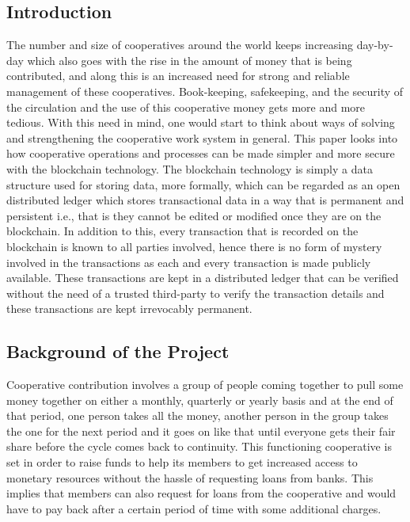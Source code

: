 \documentclass{article}
\begin{document}
\begin{flushleft}
\section{Introduction}
The number and size of cooperatives around the world keeps increasing day-by-day which also goes with the rise in the amount of money that is being contributed, and along this is an increased need for strong and reliable management of these cooperatives. Book-keeping, safekeeping, and the security of the circulation and the use of this cooperative money gets more and more tedious. With this need in mind, one would start to think about ways of solving and strengthening the cooperative work system in general. This paper looks into how cooperative operations and processes can be made simpler and more secure with the blockchain technology. The blockchain technology is simply a data structure used for storing data, more formally, which can be regarded as an open distributed ledger which stores transactional data in a way that is permanent and persistent i.e., that is they cannot be edited or modified once they are on the blockchain. In addition to this, every transaction that is recorded on the blockchain is known to all parties involved, hence there is no form of mystery involved in the transactions as each and every transaction is made publicly available. These transactions are kept in a distributed ledger that can be verified without the need of a trusted third-party to verify the transaction details and these transactions are kept irrevocably permanent. \cite{alma991019600567904436}

\subsection{Background of the Project}
Cooperative contribution involves a group of people coming together to pull some money together on either a monthly, quarterly or yearly basis and at the end of that period, one person takes all the money, another person in the group takes the one for the next period and it goes on like that until everyone gets their fair share before the cycle comes back to continuity. This functioning cooperative is set in order to raise funds to help its members to get increased access to monetary resources without the hassle of requesting loans from banks. This implies that members can also request for loans from the cooperative and would have to pay back after a certain period of time with some additional charges.


\end{flushleft}
\end{document}
